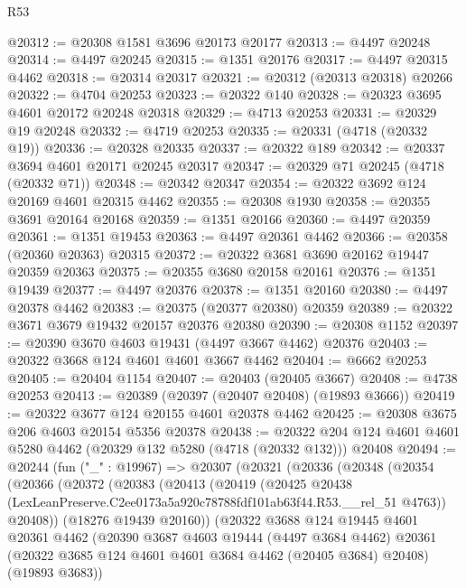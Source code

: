 \begin{lexlean}{R53}
\begin{coremodule}
@20312 := @20308 @1581 @3696 @20173 @20177
@20313 := @4497 @20248
@20314 := @4497 @20245
@20315 := @1351 @20176
@20317 := @4497 @20315 @4462
@20318 := @20314 @20317
@20321 := @20312 (@20313 @20318) @20266
@20322 := @4704 @20253
@20323 := @20322 @140
@20328 := @20323 @3695 @4601 @20172 @20248 @20318
@20329 := @4713 @20253
@20331 := @20329 @19 @20248
@20332 := @4719 @20253
@20335 := @20331 (@4718 (@20332 @19))
@20336 := @20328 @20335
@20337 := @20322 @189
@20342 := @20337 @3694 @4601 @20171 @20245 @20317
@20347 := @20329 @71 @20245 (@4718 (@20332 @71))
@20348 := @20342 @20347
@20354 := @20322 @3692 @124 @20169 @4601 @20315 @4462
@20355 := @20308 @1930
@20358 := @20355 @3691 @20164 @20168
@20359 := @1351 @20166
@20360 := @4497 @20359
@20361 := @1351 @19453
@20363 := @4497 @20361 @4462
@20366 := @20358 (@20360 @20363) @20315
@20372 := @20322 @3681 @3690 @20162 @19447 @20359 @20363
@20375 := @20355 @3680 @20158 @20161
@20376 := @1351 @19439
@20377 := @4497 @20376
@20378 := @1351 @20160
@20380 := @4497 @20378 @4462
@20383 := @20375 (@20377 @20380) @20359
@20389 := @20322 @3671 @3679 @19432 @20157 @20376 @20380
@20390 := @20308 @1152
@20397 := @20390 @3670 @4603 @19431 (@4497 @3667 @4462) @20376
@20403 := @20322 @3668 @124 @4601 @4601 @3667 @4462
@20404 := @6662 @20253
@20405 := @20404 @1154
@20407 := @20403 (@20405 @3667)
@20408 := @4738 @20253
@20413 := @20389 (@20397 (@20407 @20408) (@19893 @3666))
@20419 := @20322 @3677 @124 @20155 @4601 @20378 @4462
@20425 := @20308 @3675 @206 @4603 @20154 @5356 @20378
@20438 := @20322 @204 @124 @4601 @4601 @5280 @4462 (@20329 @132 @5280 (@4718 (@20332 @132))) @20408
@20494 := @20244
    (fun ("_" : @19967) =>
    @20307
      (@20321
        (@20336
          (@20348
            (@20354
              (@20366
                (@20372
                  (@20383
                    (@20413
                      (@20419
                        (@20425
                          @20438
                          (LexLeanPreserve.C2ee0173a5a920c78788fdf101ab63f44.R53.__rel_51 @4763))
                        @20408))
                    (@18276 @19439 @20160))
                  (@20322
                    @3688
                    @124
                    @19445
                    @4601
                    @20361
                    @4462
                    (@20390
                      @3687
                      @4603
                      @19444
                      (@4497 @3684 @4462)
                      @20361
                      (@20322 @3685 @124 @4601 @4601 @3684 @4462 (@20405 @3684) @20408)
                      (@19893 @3683))

\end{coremodule}
\end{lexlean}
